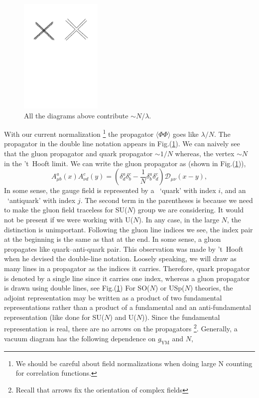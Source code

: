 \begin{figure}
\begin{center}\includegraphics[width=0.35\textwidth]{./Figures/DL3}\end{center}
\caption{\label{fig:dl2}All the diagrams above contribute $\sim N/\lambda$.}
\end{figure}

With our current normalization 
\footnote{We should be careful about field normalizations when doing large N counting for correlation functions. } 
the propagator $\langle \Phi \Phi \rangle$ goes like $\lambda/N$. The propagator in the 
double line notation appears in Fig.(\ref{fig:dl2}). 
We can naively see that the gluon propagator and quark propagator $ \sim 1/N$ 
whereas, the vertex $ \sim N$ in the 't~Hooft limit. 
We can write the gluon propagator as (shown in Fig.(\ref{fig:dl2})), 
\begin{equation}
\label{eq:gluon}
A^{a}_{\mu b}(x) A^{c}_{\nu d}(y) = \left ( \delta^{a}_{d}\delta^{c}_{b} - \frac{1}{N} \delta^{a}_{b}\delta^{c}_{d}\right)
\mathscr{D}_{\mu\nu}(x-y) , 
\end{equation}
In some sense, the gauge field is represented by a ~`quark' with index $i$, and an ~`antiquark' with index $j$. 
The second term in the parentheses is because we need to make the gluon field traceless for SU($N$) group we are
considering. It would not be present if we were working with U($N$). In any case, in the large $N$, 
the distinction is unimportant. Following the gluon line indices we see, the index pair at the beginning is 
the same as that at the end. In some sense, 
a gluon propagates like quark--anti-quark pair. This observation was made by 't~Hooft when he devised the double-line 
notation. Loosely speaking, we will draw as many lines in a propagator as the indices it carries. Therefore, quark propagator 
is denoted by a single line since it carries one index, whereas a gluon propagator is drawn using double lines, see Fig.(\ref{fig:dl2})
For SO($N$) or USp($N$) theories, the adjoint representation may be written as a product of two fundamental representations 
rather than a product of a fundamental and an anti-fundamental representation (like done for SU($N$) and U($N$)). Since the
fundamental representation is real, there are no arrows on the propagators \footnote{Recall that arrows fix the orientation of complex fields}. Generally, a vacuum diagram has the following dependence on $g_{\text{YM}}$ and $N$, 

